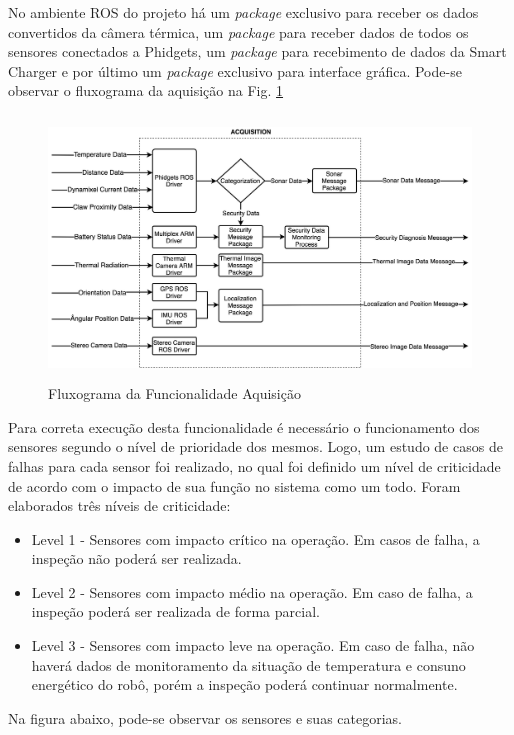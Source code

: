 \indent No ambiente ROS do projeto há um \textit{package} exclusivo para receber os dados convertidos da câmera térmica, um \textit{package} para receber dados de todos os sensores conectados a Phidgets, um \textit{package} para recebimento de dados da Smart Charger e por último um \textit{package} exclusivo para interface gráfica. 
Pode-se observar o fluxograma da aquisição na Fig. \ref{FuncAquisition}

\begin{figure}[!ht]
	\centering
	\includegraphics[height=7cm, width=14cm]{Figures/Fluxograma_Aquisition.jpg}
	\caption{Fluxograma da Funcionalidade Aquisição} \label{FuncAquisition}
\end{figure}

Para correta execução desta funcionalidade é necessário o funcionamento dos sensores segundo o nível de prioridade dos mesmos. Logo, um estudo de casos de falhas para cada sensor foi realizado, no qual foi definido um nível de criticidade de acordo com o impacto de sua função no sistema como um todo. Foram elaborados três níveis de criticidade:
\begin{itemize}
	\item Level 1 - Sensores com impacto crítico na operação. Em casos de falha, a inspeção não poderá ser realizada.
	\item Level 2 - Sensores com impacto médio na operação. Em caso de falha, a inspeção poderá ser realizada de forma parcial.
	\item Level 3 - Sensores com impacto leve na operação. Em caso de falha, não haverá dados de monitoramento da situação de temperatura e consuno energético do robô, porém a inspeção poderá continuar normalmente.
\end{itemize}

Na figura abaixo, pode-se observar os sensores e suas categorias.

